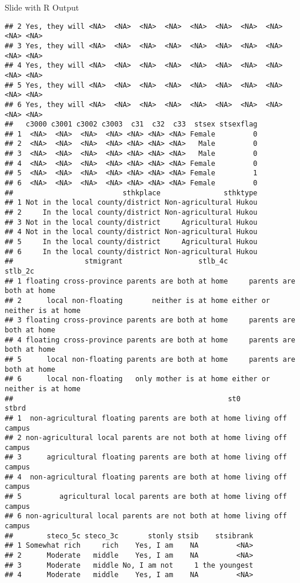 \documentclass[
  ignorenonframetext,
]{beamer}
\begin{document}
\begin{frame}[fragile]{Slide with R Output}
\begin{verbatim}
## 2 Yes, they will <NA>  <NA>  <NA>  <NA>  <NA>  <NA>  <NA>  <NA>  <NA> <NA>
## 3 Yes, they will <NA>  <NA>  <NA>  <NA>  <NA>  <NA>  <NA>  <NA>  <NA> <NA>
## 4 Yes, they will <NA>  <NA>  <NA>  <NA>  <NA>  <NA>  <NA>  <NA>  <NA> <NA>
## 5 Yes, they will <NA>  <NA>  <NA>  <NA>  <NA>  <NA>  <NA>  <NA>  <NA> <NA>
## 6 Yes, they will <NA>  <NA>  <NA>  <NA>  <NA>  <NA>  <NA>  <NA>  <NA> <NA>
##   c3000 c3001 c3002 c3003  c31  c32  c33  stsex stsexflag
## 1  <NA>  <NA>  <NA>  <NA> <NA> <NA> <NA> Female         0
## 2  <NA>  <NA>  <NA>  <NA> <NA> <NA> <NA>   Male         0
## 3  <NA>  <NA>  <NA>  <NA> <NA> <NA> <NA>   Male         0
## 4  <NA>  <NA>  <NA>  <NA> <NA> <NA> <NA> Female         0
## 5  <NA>  <NA>  <NA>  <NA> <NA> <NA> <NA> Female         1
## 6  <NA>  <NA>  <NA>  <NA> <NA> <NA> <NA> Female         0
##                          sthkplace               sthktype
## 1 Not in the local county/district Non-agricultural Hukou
## 2     In the local county/district Non-agricultural Hukou
## 3 Not in the local county/district     Agricultural Hukou
## 4 Not in the local county/district Non-agricultural Hukou
## 5     In the local county/district     Agricultural Hukou
## 6     In the local county/district Non-agricultural Hukou
##                 stmigrant                  stlb_4c                      stlb_2c
## 1 floating cross-province parents are both at home     parents are both at home
## 2      local non-floating       neither is at home either or neither is at home
## 3 floating cross-province parents are both at home     parents are both at home
## 4 floating cross-province parents are both at home     parents are both at home
## 5      local non-floating parents are both at home     parents are both at home
## 6      local non-floating   only mother is at home either or neither is at home
##                                                   st0             stbrd
## 1  non-agricultural floating parents are both at home living off campus
## 2 non-agricultural local parents are not both at home living off campus
## 3      agricultural floating parents are both at home living off campus
## 4  non-agricultural floating parents are both at home living off campus
## 5         agricultural local parents are both at home living off campus
## 6 non-agricultural local parents are not both at home living off campus
##        steco_5c steco_3c       stonly stsib    stsibrank
## 1 Somewhat rich     rich    Yes, I am    NA         <NA>
## 2      Moderate   middle    Yes, I am    NA         <NA>
## 3      Moderate   middle No, I am not     1 the youngest
## 4      Moderate   middle    Yes, I am    NA         <NA>

\end{verbatim}
\end{frame}
\end{document}
